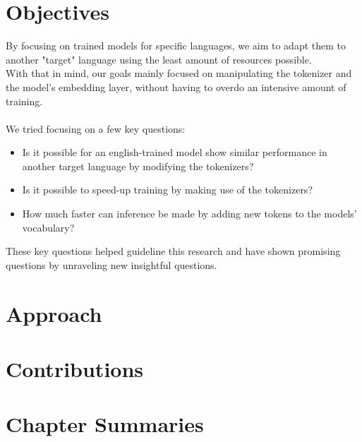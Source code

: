 \section{Objectives}\label{Section1.2}
By focusing on trained models for specific languages, we aim to adapt them to another "target" language using the least amount of resources possible.\\
With that in mind, our goals mainly focused on manipulating the tokenizer and the model's embedding layer, without having to overdo an intensive amount of training.\\
\\
We tried focusing on a few key questions:
\begin{itemize}
    \item Is it possible for an english-trained model show similar performance in another target language by modifying the tokenizers?
    \item Is it possible to speed-up training by making use of the tokenizers?
    \item How much faster can inference be made by adding new tokens to the models' vocabulary?
\end{itemize}
These key questions helped guideline this research and have shown promising questions by unraveling new insightful questions.

\section{Approach}\label{Section1.3}



\section{Contributions}\label{Section1.4}

\section{Chapter Summaries}\label{Section1.5}